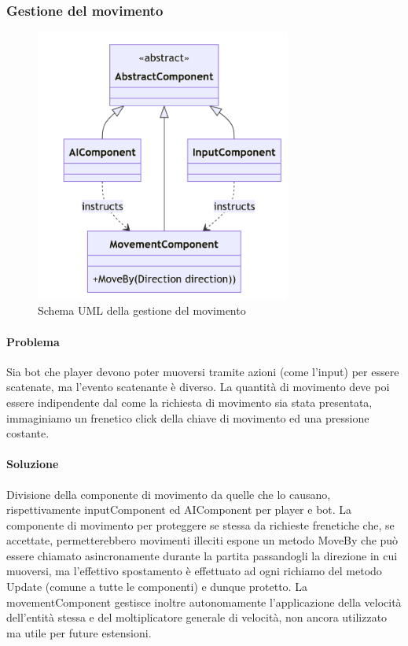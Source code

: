 \documentclass[a4paper,12pt]{report}
\begin{document}
%
\subsubsection*{Gestione del movimento}
%
\begin{figure}[H]
    \centering{}
    \includegraphics[width=0.75\textwidth]{img/UMLMovement.png}
    \caption{Schema UML della gestione del movimento}
\end{figure}
%
\paragraph*{Problema} Sia bot che player devono poter muoversi tramite azioni (come l’input) per essere scatenate, ma l’evento scatenante è diverso.
La quantità di movimento deve poi essere indipendente dal come la richiesta di movimento sia stata presentata, immaginiamo un frenetico click della chiave di movimento ed una pressione costante.

%
\paragraph*{Soluzione} Divisione della componente di movimento da quelle che lo causano, rispettivamente inputComponent ed AIComponent per player e bot.
La componente di movimento per proteggere se stessa da richieste frenetiche che, se accettate, permetterebbero movimenti illeciti espone un metodo MoveBy che può essere chiamato asincronamente durante la partita passandogli la direzione in cui muoversi, ma l’effettivo spostamento è effettuato ad ogni richiamo del metodo Update (comune a tutte le componenti) e dunque protetto.
La movementComponent gestisce inoltre autonomamente l’applicazione della velocità dell’entità stessa e del moltiplicatore generale di velocità, non ancora utilizzato ma utile per future estensioni.
\end{document}
